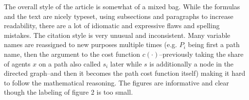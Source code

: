 \documentclass[../review.tex]{subfiles}
\begin{document}
The overall style of the article is somewhat of a mixed bag. While the formulas and the text are nicely typeset, using subsections and paragraphs to increase readability, there are a lot of idiomatic and expressive flaws and spelling mistakes. The citation style is very unusual and inconsistent. Many variable names are reassigned to new purposes multiple times (e.g. $P_i$ being first a path name, then the argument to the cost function $c(\cdot)$--previously taking the share of agents $x$ on a path also called $s_i$ later while $s$ is additionally a node in the directed graph--and then it becomes the path cost function itself) making it hard to follow the mathematical reasoning. The figures are informative and clear though the labeling of figure 2 is too small.
\end{document}
